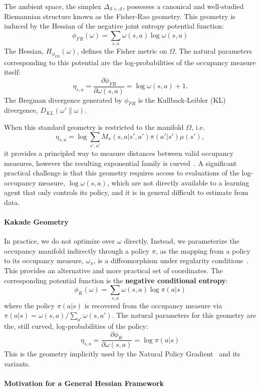 \documentclass{article}
\theoremstyle{plain}
\theoremstyle{definition}
\theoremstyle{remark}
\newcommand{\sS}{\mathcal{S}}
\newcommand{\sA}{\mathcal{A}}
\begin{document}
The ambient space, the simplex $\Delta_{\sS\times\sA}$, possesses a canonical and well-studied Riemannian structure known as the Fisher-Rao geometry.
This geometry is induced by the Hessian of the negative joint entropy potential function:
    $$ \phi_{FR}(\omega) = \sum_{s,a} \omega(s,a) \log \omega(s,a) $$
The Hessian, $H_{\phi_{FR}}(\omega)$, defines the Fisher metric on $\Omega$.
The natural parameters corresponding to this potential are the log-probabilities of the occupancy measure itself:
    $$ \eta_{s,a} = \frac{\partial \phi_{FR}}{\partial \omega(s,a)} = \log \omega(s,a) + 1 .$$
The Bregman divergence generated by $\phi_{FR}$ is the Kullback-Leibler (KL) divergence, $D_{KL}(\omega'\|\omega)$.

When this standard geometry is restricted to the manifold $\Omega$, i.e.
$$\eta_{s,a} = \log \sum_{s',a'}M_\pi(s,a|s',a')\pi(a'|s')\mu(s'),$$
it provides a principled way to measure distances between valid occupancy measures, however the resulting exponential family is curved~\cite{amari1982differential}. 
A significant practical challenge is that this geometry requires access to evaluations of the log-occupancy measure, $\log \omega(s,a)$, which are not directly available to a learning agent that only controls its policy, and it is in general difficult to estimate from data.

\paragraph{Kakade Geometry}

In practice, we do not optimize over $\omega$ directly. Instead, we parameterize the occupancy manifold indirectly through a policy $\pi$, as the mapping from a policy to its occupancy measure, $\omega_\pi$, is a diffeomorphism under regularity conditions~\citep{muller2024geometry}. 
This provides an alternative and more practical set of coordinates.
The corresponding potential function is the \textbf{negative conditional entropy}:
$$ \phi_{K}(\omega) = \sum_{s,a} \omega(s,a) \log \pi(a|s) $$
where the policy $\pi(a|s)$ is recovered from the occupancy measure via $\pi(a|s) = \omega(s,a) / \sum_{a'} \omega(s,a')$.
The natural parameters for this geometry are the, still curved, log-probabilities of the policy:
$$ \eta_{s,a} = \frac{\partial \phi_{K}}{\partial \omega(s,a)} = \log \pi(a|s) $$
This is the geometry implicitly used by the Natural Policy Gradient~\citep{kakade2001natural} and its variants.

\paragraph{Motivation for a General Hessian Framework}
\end{document}
